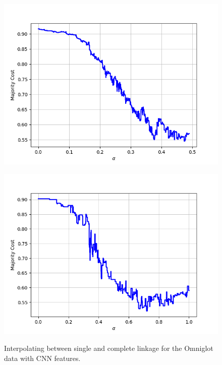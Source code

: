 \begin{figure}[H]
\begin{minipage}{.24\textwidth}
  {\includegraphics[width=\linewidth]{plots/omniglot-intra-sc-cnn/Tagalog}}
\end{minipage}
\begin{minipage}{.24\textwidth}
  \centering
  {\includegraphics[width=\linewidth]{plots/omniglot-intra-sc-cnn/Tifinagh}}
\end{minipage}
\caption{%
  Interpolating between single and complete linkage for the Omniglot data with CNN features.}
\label{}
\end{figure}